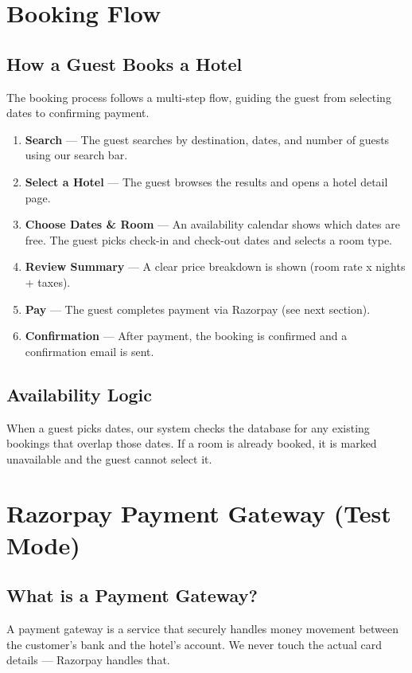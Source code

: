 \documentclass[12pt,a4paper]{article}
\begin{document}
\newpage
\section{Booking Flow}

\subsection{How a Guest Books a Hotel}

The booking process follows a multi-step flow, guiding the guest from selecting dates to confirming payment.

\begin{enumerate}
  \item \textbf{Search} --- The guest searches by destination, dates, and number of guests using our search bar.
  \item \textbf{Select a Hotel} --- The guest browses the results and opens a hotel detail page.
  \item \textbf{Choose Dates \& Room} --- An availability calendar shows which dates are free. The guest picks check-in and check-out dates and selects a room type.
  \item \textbf{Review Summary} --- A clear price breakdown is shown (room rate x nights + taxes).
  \item \textbf{Pay} --- The guest completes payment via Razorpay (see next section).
  \item \textbf{Confirmation} --- After payment, the booking is confirmed and a confirmation email is sent.
\end{enumerate}

\subsection{Availability Logic}
When a guest picks dates, our system checks the database for any existing bookings that overlap those dates. If a room is already booked, it is marked unavailable and the guest cannot select it.

\newpage
\section{Razorpay Payment Gateway (Test Mode)}

\subsection{What is a Payment Gateway?}
A payment gateway is a service that securely handles money movement between the customer's bank and the hotel's account. We never touch the actual card details --- Razorpay handles that.
\end{document}
